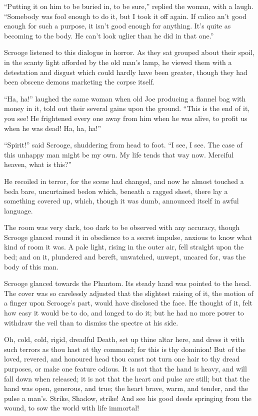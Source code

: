 \documentclass[paper=5.5in:8.5in,BCOR=7mm,twoside,DIV=calc,12pt,usegeometry]{scrbook} %
\begin{document}
\enquote{Putting it on him to be buried in, to be sure,} replied the woman, with a laugh. \enquote{Somebody was fool enough to do it, but I took it off again. If calico an't good enough for such a purpose, it isn't good enough for anything. It's quite as becoming to the body. He can't look uglier than he did in that one.}

Scrooge listened to this dialogue in horror. As they sat grouped about their spoil, in the scanty light afforded by the old man's lamp, he viewed them with a detestation and disgust which could hardly have been greater, though they had been obscene demons marketing the corpse itself.

\enquote{Ha, ha!} laughed the same woman when old Joe producing a flannel bag with money in it, told out their several gains upon the ground. \enquote{This is the end of it, you see! He frightened every one away from him when he was alive, to profit us when he was dead! Ha, ha, ha!}

\enquote{Spirit!} said Scrooge, shuddering from head to foot. \enquote{I see, I see. The case of this unhappy man might be my own. My life tends that way now. Merciful heaven, what is this?}

He recoiled in terror, for the scene had changed, and now he almost touched a bed\textemdash a bare, uncurtained bed\textemdash on which, beneath a ragged sheet, there lay a something covered up, which, though it was dumb, announced itself in awful language.

The room was very dark, too dark to be observed with any accuracy, though Scrooge glanced round it in obedience to a secret impulse, anxious to know what kind of room it was. A pale light, rising in the outer air, fell straight upon the bed; and on it, plundered and bereft, unwatched, unwept, uncared for, was the body of this man.

Scrooge glanced towards the Phantom. Its steady hand was pointed to the head. The cover was so carelessly adjusted that the slightest raising of it, the motion of a finger upon Scrooge's part, would have disclosed the face. He thought of it, felt how easy it would be to do, and longed to do it; but he had no more power to withdraw the veil than to dismiss the spectre at his side.

Oh, cold, cold, rigid, dreadful Death, set up thine altar here, and dress it with such terrors as thou hast at thy command; for this is thy dominion! But of the loved, revered, and honoured head thou canst not turn one hair to thy dread purposes, or make one feature odious. It is not that the hand is heavy, and will fall down when released; it is not that the heart and pulse are still; but that the hand was open, generous, and true; the heart brave, warm, and tender, and the pulse a man's. Strike, Shadow, strike! And see his good deeds springing from the wound, to sow the world with life immortal!
\end{document}
